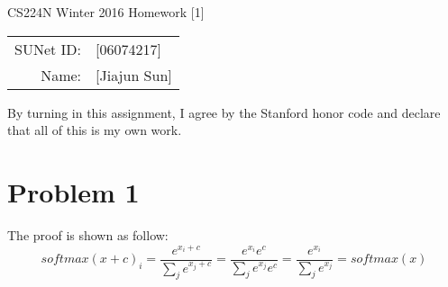 \documentclass[12pt]{article}
\begin{document}
\begin{center}
{\Large CS224N Winter 2016 Homework [1]}

\begin{tabular}{rl}
SUNet ID: & [06074217] \\
Name: & [Jiajun Sun] \\
\end{tabular}
\end{center}

By turning in this assignment, I agree by the Stanford honor code and declare
that all of this is my own work.

\section*{Problem 1}
\begin{enumerate}[label=(\alph*)]
The proof is shown as follow:
    \begin{equation*}
    	softmax(x+c)_i=\frac{e^{x_i+c}}{\sum_j e^{x_j+c}}=\frac{e^{x_i}e^c}{\sum_j e^{x_j}e^c}=\frac{e^{x_i}}{\sum_j e^{x_j}}=softmax(x)
    \end{equation*}

\end{enumerate}
\end{document}
